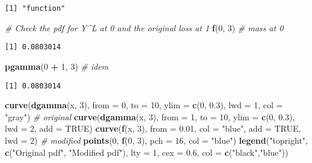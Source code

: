 \documentclass[]{book}
\newenvironment{Shaded}{\begin{snugshade}}{\end{snugshade}}
\newcommand{\KeywordTok}[1]{\textcolor[rgb]{0.13,0.29,0.53}{\textbf{#1}}}
\newcommand{\DataTypeTok}[1]{\textcolor[rgb]{0.13,0.29,0.53}{#1}}
\newcommand{\DecValTok}[1]{\textcolor[rgb]{0.00,0.00,0.81}{#1}}
\newcommand{\FloatTok}[1]{\textcolor[rgb]{0.00,0.00,0.81}{#1}}
\newcommand{\StringTok}[1]{\textcolor[rgb]{0.31,0.60,0.02}{#1}}
\newcommand{\CommentTok}[1]{\textcolor[rgb]{0.56,0.35,0.01}{\textit{#1}}}
\newcommand{\OtherTok}[1]{\textcolor[rgb]{0.56,0.35,0.01}{#1}}
\newcommand{\OperatorTok}[1]{\textcolor[rgb]{0.81,0.36,0.00}{\textbf{#1}}}
\newcommand{\NormalTok}[1]{#1}
\theoremstyle{definition}
\theoremstyle{definition}
\theoremstyle{definition}
\theoremstyle{remark}
\begin{document}
\begin{verbatim}
[1] "function"
\end{verbatim}

\begin{Shaded}
\begin{Highlighting}[]
\CommentTok{# Check the pdf for Y^L at 0 and the original loss at 1}
\KeywordTok{f}\NormalTok{(}\DecValTok{0}\NormalTok{, }\DecValTok{3}\NormalTok{)  }\CommentTok{# mass at 0}
\end{Highlighting}
\end{Shaded}

\begin{verbatim}
[1] 0.0803014
\end{verbatim}

\begin{Shaded}
\begin{Highlighting}[]
\KeywordTok{pgamma}\NormalTok{(}\DecValTok{0} \OperatorTok{+}\StringTok{ }\DecValTok{1}\NormalTok{, }\DecValTok{3}\NormalTok{)  }\CommentTok{# idem}
\end{Highlighting}
\end{Shaded}

\begin{verbatim}
[1] 0.0803014
\end{verbatim}

\begin{Shaded}
\begin{Highlighting}[]
\KeywordTok{curve}\NormalTok{(}\KeywordTok{dgamma}\NormalTok{(x, }\DecValTok{3}\NormalTok{), }\DataTypeTok{from =} \DecValTok{0}\NormalTok{, }\DataTypeTok{to =} \DecValTok{10}\NormalTok{, }\DataTypeTok{ylim =} \KeywordTok{c}\NormalTok{(}\DecValTok{0}\NormalTok{, }\FloatTok{0.3}\NormalTok{), }\DataTypeTok{lwd =} \DecValTok{1}\NormalTok{, }\DataTypeTok{col =} \StringTok{"gray"}\NormalTok{)  }\CommentTok{# original}
\KeywordTok{curve}\NormalTok{(}\KeywordTok{dgamma}\NormalTok{(x, }\DecValTok{3}\NormalTok{), }\DataTypeTok{from =} \DecValTok{1}\NormalTok{, }\DataTypeTok{to =} \DecValTok{10}\NormalTok{, }\DataTypeTok{ylim =} \KeywordTok{c}\NormalTok{(}\DecValTok{0}\NormalTok{, }\FloatTok{0.3}\NormalTok{), }\DataTypeTok{lwd =} \DecValTok{2}\NormalTok{, }\DataTypeTok{add =} \OtherTok{TRUE}\NormalTok{)}
\KeywordTok{curve}\NormalTok{(}\KeywordTok{f}\NormalTok{(x, }\DecValTok{3}\NormalTok{), }\DataTypeTok{from =} \FloatTok{0.01}\NormalTok{, }\DataTypeTok{col =} \StringTok{"blue"}\NormalTok{, }\DataTypeTok{add =} \OtherTok{TRUE}\NormalTok{, }\DataTypeTok{lwd =} \DecValTok{2}\NormalTok{)  }\CommentTok{# modified}
\KeywordTok{points}\NormalTok{(}\DecValTok{0}\NormalTok{, }\KeywordTok{f}\NormalTok{(}\DecValTok{0}\NormalTok{, }\DecValTok{3}\NormalTok{), }\DataTypeTok{pch =} \DecValTok{16}\NormalTok{, }\DataTypeTok{col =} \StringTok{"blue"}\NormalTok{)}
\KeywordTok{legend}\NormalTok{(}\StringTok{"topright"}\NormalTok{, }\KeywordTok{c}\NormalTok{(}\StringTok{"Original pdf"}\NormalTok{, }\StringTok{"Modified pdf"}\NormalTok{), }
       \DataTypeTok{lty =} \DecValTok{1}\NormalTok{, }\DataTypeTok{cex =} \FloatTok{0.6}\NormalTok{, }\DataTypeTok{col =} \KeywordTok{c}\NormalTok{(}\StringTok{"black"}\NormalTok{,}\StringTok{"blue"}\NormalTok{))}
\end{Highlighting}
\end{Shaded}
\end{document}
